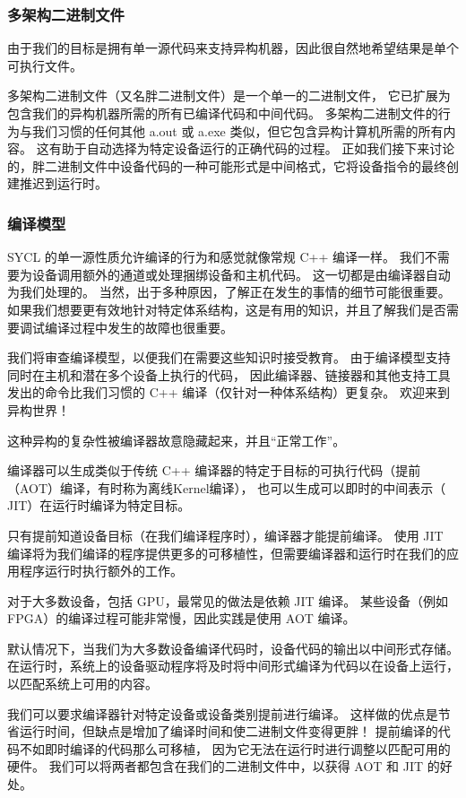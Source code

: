 \subsubsection{多架构二进制文件}
由于我们的目标是拥有单一源代码来支持异构机器，因此很自然地希望结果是单个可执行文件。

多架构二进制文件（又名胖二进制文件）是一个单一的二进制文件，
它已扩展为包含我们的异构机器所需的所有已编译代码和中间代码。 
多架构二进制文件的行为与我们习惯的任何其他 a.out 或 a.exe 类似，但它包含异构计算机所需的所有内容。 
这有助于自动选择为特定设备运行的正确代码的过程。 
正如我们接下来讨论的，胖二进制文件中设备代码的一种可能形式是中间格式，它将设备指令的最终创建推迟到运行时。

\subsubsection{编译模型}
SYCL 的单一源性质允许编译的行为和感觉就像常规 C++ 编译一样。 
我们不需要为设备调用额外的通道或处理捆绑设备和主机代码。 这一切都是由编译器自动为我们处理的。 
当然，出于多种原因，了解正在发生的事情的细节可能很重要。 
如果我们想要更有效地针对特定体系结构，这是有用的知识，并且了解我们是否需要调试编译过程中发生的故障也很重要。

我们将审查编译模型，以便我们在需要这些知识时接受教育。 
由于编译模型支持同时在主机和潜在多个设备上执行的代码，
因此编译器、链接器和其他支持工具发出的命令比我们习惯的 C++ 编译（仅针对一种体系结构）更复杂。 欢迎来到异构世界！

这种异构的复杂性被编译器故意隐藏起来，并且“正常工作”。

编译器可以生成类似于传统 C++ 编译器的特定于目标的可执行代码（提前（AOT）编译，有时称为离线Kernel编译），
也可以生成可以即时的中间表示（ JIT）在运行时编译为特定目标。

只有提前知道设备目标（在我们编译程序时），编译器才能提前编译。 
使用 JIT 编译将为我们编译的程序提供更多的可移植性，但需要编译器和运行时在我们的应用程序运行时执行额外的工作。

对于大多数设备，包括 GPU，最常见的做法是依赖 JIT 编译。 
某些设备（例如 FPGA）的编译过程可能非常慢，因此实践是使用 AOT 编译。

默认情况下，当我们为大多数设备编译代码时，设备代码的输出以中间形式存储。 
在运行时，系统上的设备驱动程序将及时将中间形式编译为代码以在设备上运行，以匹配系统上可用的内容。

我们可以要求编译器针对特定设备或设备类别提前进行编译。 
这样做的优点是节省运行时间，但缺点是增加了编译时间和使二进制文件变得更胖！ 提前编译的代码不如即时编译的代码那么可移植，
因为它无法在运行时进行调整以匹配可用的硬件。 我们可以将两者都包含在我们的二进制文件中，以获得 AOT 和 JIT 的好处。

